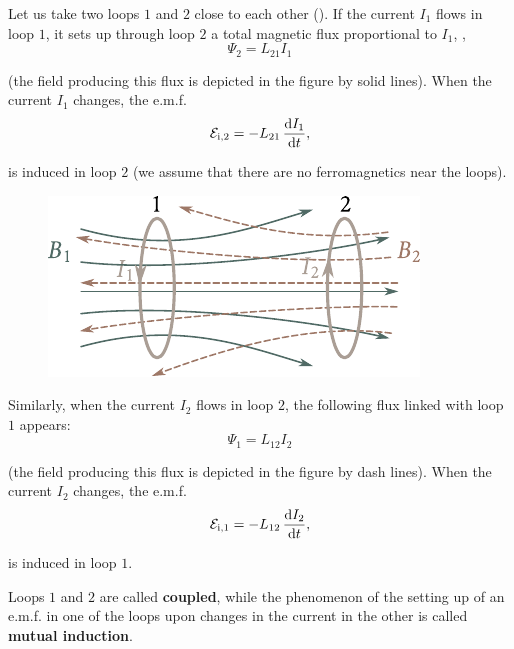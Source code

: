 Let us take two loops $1$ and $2$ close to each other ().
If the current $I_1$ flows in loop $1$, it sets up through loop $2$ a total magnetic flux proportional to $I_1$, \ie,
\begin{equation}\label{eq:8_26}
	\Psi_2 = L_{21} I_1
\end{equation}

\noindent
(the field producing this flux is depicted in the figure by solid lines).
When the current $I_1$ changes, the e.m.f.
\begin{equation}\label{eq:8_27}
	\mathcal{E}_{\text{i,$2$}} = - L_{21}\, \dfrac{\mathrm{d} I_1}{\mathrm{d} t},
\end{equation}

\noindent
is induced in loop $2$ (we assume that there are no ferromagnetics near the loops).

\begin{figure}[t]
	\begin{center}
		\includegraphics[scale=1]{figures/ch_08/fig_8_9.pdf}
		\caption[]{}
		\label{fig:8_9}
	\end{center}
	\vspace{-0.8cm}
\end{figure}

Similarly, when the current $I_2$ flows in loop $2$, the following flux linked with loop $1$ appears:
\begin{equation}\label{eq:8_28}
	\Psi_1 = L_{12} I_2
\end{equation}

\noindent
(the field producing this flux is depicted in the figure by dash lines).
When the current $I_2$ changes, the e.m.f.
\begin{equation}\label{eq:8_29}
	\mathcal{E}_{\text{i,$1$}} = - L_{12}\, \dfrac{\mathrm{d} I_2}{\mathrm{d} t},
\end{equation}

\noindent
is induced in loop $1$.

Loops $1$ and $2$ are called \textbf{coupled}, while the phenomenon of the setting up of an e.m.f. in one of the loops upon changes in the current in the other is called \textbf{mutual induction}.

